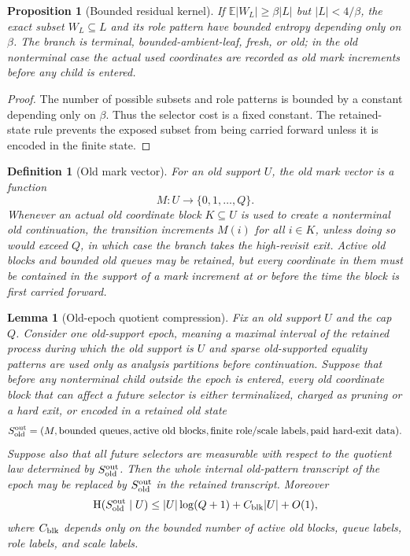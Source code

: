 \documentclass[11pt]{article}
\newtheorem{lemma}[theorem]{Lemma}
\newtheorem{proposition}[theorem]{Proposition}
\newtheorem{definition}[theorem]{Definition}
\theoremstyle{remark}
\newcommand{\E}{\mathbb E}
\newcommand{\HH}{\mathrm H}
\newcommand{\old}{\mathrm{old}}
\begin{document}
\begin{proposition}[Bounded residual kernel]\label{prop:bounded-residual}
If $\E|W_L|\ge \beta |L|$ but $|L|<4/\beta$, the exact subset $W_L\subseteq L$ and its role pattern have bounded entropy depending only on $\beta$.  The branch is terminal, bounded-ambient-leaf, fresh, or old; in the old nonterminal case the actual used coordinates are recorded as old mark increments before any child is entered.
\end{proposition}

\begin{proof}
The number of possible subsets and role patterns is bounded by a constant depending only on $\beta$.  Thus the selector cost is a fixed constant.  The retained-state rule prevents the exposed subset from being carried forward unless it is encoded in the finite state.
\end{proof}

\begin{definition}[Old mark vector]
For an old support $U$, the old mark vector is a function
\[
        M:U\to\{0,1,\ldots,Q\}.
\]
Whenever an actual old coordinate block $K\subseteq U$ is used to create a nonterminal old continuation, the transition increments $M(i)$ for all $i\in K$, unless doing so would exceed $Q$, in which case the branch takes the high-revisit exit.  Active old blocks and bounded old queues may be retained, but every coordinate in them must be contained in the support of a mark increment at or before the time the block is first carried forward.
\end{definition}

\begin{lemma}[Old-epoch quotient compression]\label{lem:old-epoch-quotient}
Fix an old support $U$ and the cap $Q$.  Consider one old-support epoch, meaning a maximal interval of the retained process during which the old support is $U$ and sparse old-supported equality patterns are used only as analysis partitions before continuation.  Suppose that before any nonterminal child outside the epoch is entered, every old coordinate block that can affect a future selector is either terminalized, charged as pruning or a hard exit, or encoded in a retained old state
\[
        S_{\old}^{\rm out}
        =(M,\hbox{bounded queues},\hbox{active old blocks},
          \hbox{finite role/scale labels},\hbox{paid hard-exit data}).
\]
Suppose also that all future selectors are measurable with respect to the quotient law determined by $S_{\old}^{\rm out}$.  Then the whole internal old-pattern transcript of the epoch may be replaced by $S_{\old}^{\rm out}$ in the retained transcript.  Moreover
\[
        \HH(S_{\old}^{\rm out}\mid U)
        \le |U|\log(Q+1)+C_{\rm blk}|U|+O(1),
\]
where $C_{\rm blk}$ depends only on the bounded number of active old blocks, queue labels, role labels, and scale labels.
\end{lemma}
\end{document}
